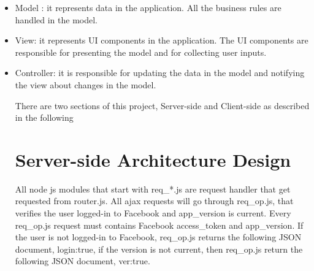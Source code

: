 \begin{itemize}
\item Model : it represents data in the application. All the business rules are handled in the model.
\item View: it represents UI components in the application. The UI components are responsible for presenting the model and for collecting user inputs.
\item Controller: it is responsible for updating the data in the model and notifying the view about changes in the model.

There are two sections of this project, Server-side and Client-side as described in the following

\section{Server-side Architecture Design}

All node js modules that start with req{\_}*.js are request handler that get requested from router.js. All ajax requests will go through req{\_}op.js, that verifies the user logged-in to Facebook and app{\_}version is current. Every req{\_}op.js request must contains Facebook access{\_}token and app{\_}version. If the user is not logged-in to Facebook, req{\_}op.js returns the following JSON document, {login:true}, if the version is not current, then req{\_}op.js return the following JSON document, {ver:true}. 


\end{itemize}
